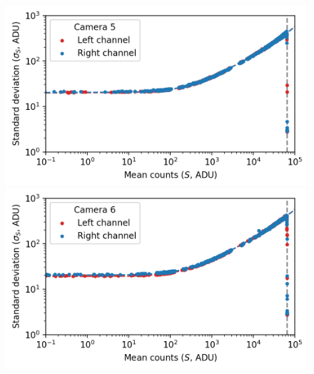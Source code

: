 \begin{colsection}
\begin{colsection}
\begin{figure}[p]
\begin{center}
        \begin{minipage}[t]{0.49\textwidth}\vspace{10pt}
            \includegraphics[width=\linewidth]{images/detectors/ptc_5.png}
        \end{minipage}
        \begin{minipage}[t]{0.49\textwidth}\vspace{10pt}
            \includegraphics[width=\linewidth]{images/detectors/ptc_6.png}
        \end{minipage}


\end{center}
\end{figure}
\end{colsection}
\end{colsection}
